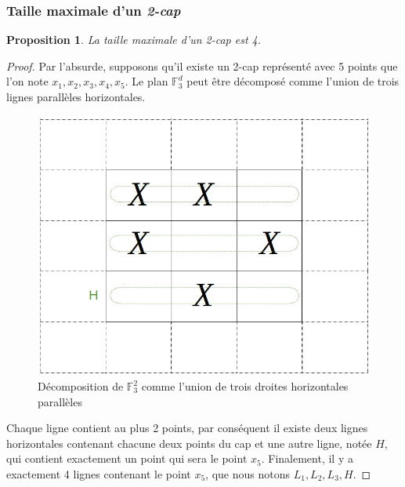 \documentclass[a4paper,12pt,titlepage]{article}
\theoremstyle{plain}
\newtheorem{prop}{Proposition}
\theoremstyle{definition}
\newcommand{\Ftrois}[1]{\mathbb{F}^#1_3}
\begin{document}
\subsubsection{Taille maximale d'un \emph{2-cap}}
\begin{prop} \label{prop:2cap}
La taille maximale d'un \emph{2-cap} est 4.
\end{prop}
\begin{proof}  
Par l'absurde, supposons qu'il existe un 2-cap représenté avec 5 points que l'on note $x_1,x_2,x_3,x_4,x_5$. Le plan $\mathbb{F}_3^d$ peut être décomposé comme l'union de trois lignes parallèles horizontales.

\begin{figure}[h!] %
\centering
\includegraphics[scale=0.4]{Img/FigProp1v2.jpg}
\caption{Décomposition de $\Ftrois{2}$ comme l'union de trois droites horizontales parallèles}
\end{figure}

Chaque ligne contient au plus 2 points, par conséquent il existe deux lignes horizontales contenant chacune deux points du cap et une autre ligne, notée $H$, qui contient exactement un point qui sera le point $x_5$. Finalement, il y a exactement 4 lignes contenant le point $x_5$, que nous notons $L_1,L_2,L_3,H$. %


\end{proof}
\end{document}
